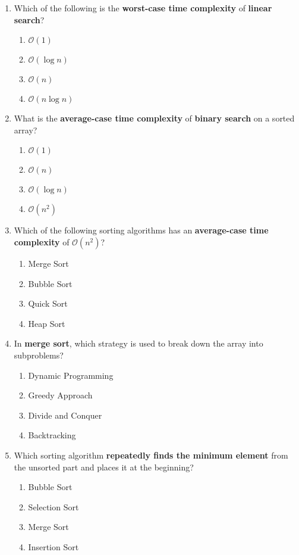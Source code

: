 \documentclass[a4paper,12pt]{article}
\begin{document}
\begin{enumerate}
  \item Which of the following is the \textbf{worst-case time complexity} of \textbf{linear search}?
  \begin{enumerate}[label=(\alph*)]
    \item \(\mathcal{O}(1)\)
    \item \(\mathcal{O}(\log n)\)
    \item \(\mathcal{O}(n)\)
    \item \(\mathcal{O}(n \log n)\)
  \end{enumerate}

  \item What is the \textbf{average-case time complexity} of \textbf{binary search} on a sorted array?
  \begin{enumerate}[label=(\alph*)]
    \item \(\mathcal{O}(1)\)
    \item \(\mathcal{O}(n)\)
    \item \(\mathcal{O}(\log n)\)
    \item \(\mathcal{O}(n^2)\)
  \end{enumerate}

  \item Which of the following sorting algorithms has an \textbf{average-case time complexity} of \(\mathcal{O}(n^2)\)?
  \begin{enumerate}[label=(\alph*)]
    \item Merge Sort
    \item Bubble Sort
    \item Quick Sort
    \item Heap Sort
  \end{enumerate}

  \item In \textbf{merge sort}, which strategy is used to break down the array into subproblems?
  \begin{enumerate}[label=(\alph*)]
    \item Dynamic Programming
    \item Greedy Approach
    \item Divide and Conquer
    \item Backtracking
  \end{enumerate}

  \item Which sorting algorithm \textbf{repeatedly finds the minimum element} from the unsorted part and places it at the beginning?
  \begin{enumerate}[label=(\alph*)]
    \item Bubble Sort
    \item Selection Sort
    \item Merge Sort
    \item Insertion Sort
  \end{enumerate}


\end{enumerate}
\end{document}
